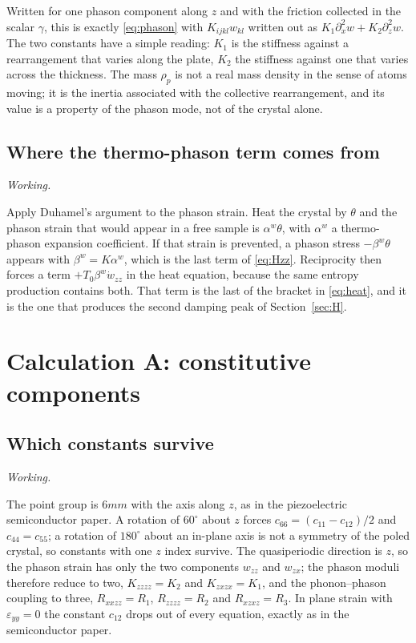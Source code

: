 \documentclass[11pt,a4paper]{article}
\newif\ifshowworked \showworkedtrue
\newenvironment{worked}{\ifshowworked\par\smallskip\noindent\textit{Working.}\par\else\setbox0\vbox\bgroup\fi}{\ifshowworked\par\smallskip\else\egroup\fi}
\newcommand{\eps}{\varepsilon}
\newcommand{\bwth}{\beta^{w}}
\begin{document}
\noindent Written for one phason component along $z$ and with the friction collected in the scalar $\gamma$,
this is exactly \eqref{eq:phason} with $K_{ijkl}w_{kl}$ written out as $K_1\partial_x^2w+K_2\partial_z^2w$. The
two constants have a simple reading: $K_1$ is the stiffness against a rearrangement that varies along the
plate, $K_2$ the stiffness against one that varies across the thickness. The mass $\rho_p$ is not a real mass
density in the sense of atoms moving; it is the inertia associated with the collective rearrangement, and its
value is a property of the phason mode, not of the crystal alone.

\subsection{Where the thermo-phason term comes from}

\begin{worked}
Apply Duhamel's argument to the phason strain. Heat the crystal by $\theta$ and the phason strain that would
appear in a free sample is $\alpha^{w}\theta$, with $\alpha^{w}$ a thermo-phason expansion coefficient. If
that strain is prevented, a phason stress $-\bwth\theta$ appears with $\bwth=K\alpha^{w}$, which is the last
term of \eqref{eq:Hzz}. Reciprocity then forces a term $+T_0\bwth\dot w_{zz}$ in the heat equation, because the
same entropy production contains both. That term is the last of the bracket in \eqref{eq:heat}, and it is the
one that produces the second damping peak of Section~\ref{sec:H}.
\end{worked}

\section{Calculation A: constitutive components}\label{sec:A}

\subsection{Which constants survive}

\begin{worked}
The point group is $6mm$ with the axis along $z$, as in the piezoelectric semiconductor paper. A rotation of
$60^\circ$ about $z$ forces $c_{66}=(c_{11}-c_{12})/2$ and $c_{44}=c_{55}$; a rotation of $180^\circ$ about
an in-plane axis is not a symmetry of the poled crystal, so constants with one $z$ index survive. The
quasiperiodic direction is $z$, so the phason strain has only the two components $w_{zz}$ and $w_{zx}$; the
phason moduli therefore reduce to two, $K_{zzzz}=K_2$ and $K_{zxzx}=K_1$, and the phonon--phason coupling to
three, $R_{xxzz}=R_1$, $R_{zzzz}=R_2$ and $R_{xzxz}=R_3$. In plane strain with $\eps_{yy}=0$ the constant
$c_{12}$ drops out of every equation, exactly as in the semiconductor paper.
\end{worked}
\end{document}
